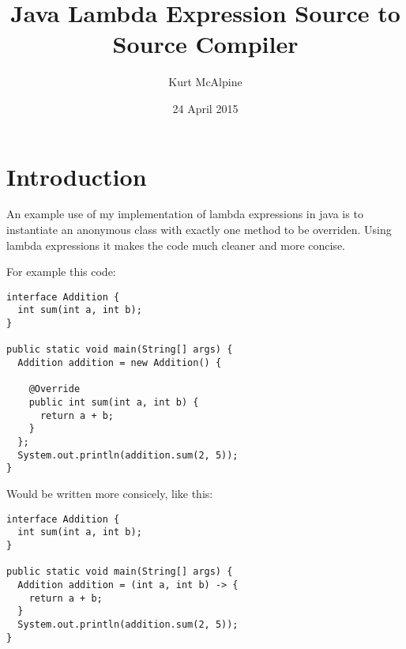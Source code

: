 \documentclass[twocolumn]{report}
\begin{document}
\title{Java Lambda Expression Source to Source Compiler}
\author{Kurt McAlpine}
\date{24 April 2015}
\maketitle

\chapter{Introduction}
An example use of my implementation of lambda expressions in java is to
instantiate an anonymous class with exactly one method to be overriden. Using
lambda expressions it makes the code much cleaner and more concise.

For example this code:
\begin{lstlisting}
interface Addition {
  int sum(int a, int b);
}

public static void main(String[] args) {
  Addition addition = new Addition() {

    @Override
    public int sum(int a, int b) {
      return a + b;
    }
  };
  System.out.println(addition.sum(2, 5));
}
\end{lstlisting}
Would be written more consicely, like this:
\begin{lstlisting}
interface Addition {
  int sum(int a, int b);
}

public static void main(String[] args) {
  Addition addition = (int a, int b) -> {
    return a + b;
  }
  System.out.println(addition.sum(2, 5));
}
\end{lstlisting}
\end{document}
